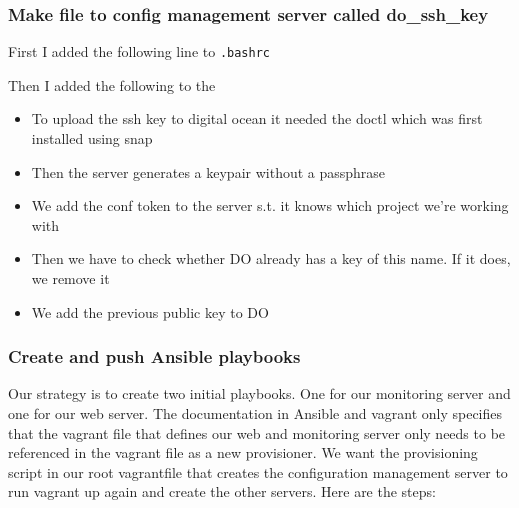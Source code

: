 \hypertarget{make-file-to-config-management-server-called-do_ssh_key}{%
\subsubsection{Make file to config management server called
do\_ssh\_key}\label{make-file-to-config-management-server-called-do_ssh_key}}

First I added the following line to \texttt{.bashrc}


Then I added the following to the

\begin{itemize}
    \item To upload the ssh key to digital ocean it needed the doctl which was first installed using snap
    \item Then the server generates a keypair without a passphrase
    \item We add the conf token to the server s.t. it knows which project we're working with
    \item Then we have to check whether DO already has a key of this name. If it does, we remove it
    \item We add the previous public key to DO
\end{itemize}

\subsubsection{Create and push Ansible playbooks}
\label{log:create-and-push-ansible-playbooks}

Our strategy is to create two initial playbooks. One for our monitoring
server and one for our web server. The documentation in Ansible and
vagrant only specifies that the vagrant file that defines our web and
monitoring server only needs to be referenced in the vagrant file as a
new provisioner. We want the provisioning script in our root vagrantfile
that creates the configuration management server to run vagrant up again
and create the other servers. Here are the steps:

